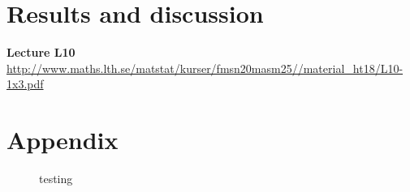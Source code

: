 \documentclass[a4paper,english]{article}
\newcommand{\sexion}[1]{\section{#1}}
\begin{document}
\section{Results and discussion}


\newpage

\begin{thebibliography}{37}
  \textbf{Lecture L10} \\
\url{http://www.maths.lth.se/matstat/kurser/fmsn20masm25//material_ht18/L10-1x3.pdf}
\end{thebibliography}
\pagebreak{}

\sexion{Appendix}
\begin{figure}[H]
  \centering
  \caption{testing}
  \label{fig:kmeans:1:2:1}
\end{figure}


% 


\pagebreak{}
\thispagestyle{empty}
\end{document}
